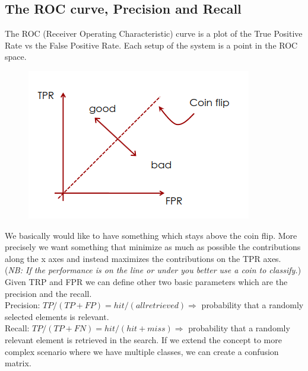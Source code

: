 \subsection{The ROC curve, Precision and Recall}
The ROC (Receiver Operating Characteristic) curve is a plot of the True Positive Rate vs the False Positive Rate. Each setup of the system is a point in the ROC space.
\begin{figure}[h]
    \centering
    \includegraphics[scale=0.5]{Figures/ROC.png}
\end{figure}
We basically would like to have something which stays above the coin flip. More precisely we want something that minimize as much as possible the contributions along the x axes and instead maximizes the contributions on the TPR axes.
\\(\textit{NB: If the performance is on the line or under you better use a coin to classify.})
Given TRP and FPR we can define other two basic parameters which are the precision and the recall.
\\Precision: $TP/(TP+FP) = hit/(all retrieved) \Rightarrow$ probability that a randomly selected elements is relevant.
\\Recall: $TP/(TP+FN) = hit/(hit+miss) \Rightarrow$ probability that a randomly relevant element is retrieved in the search.
If we extend the concept to more complex scenario where we have multiple classes, we can create a confusion matrix. 
